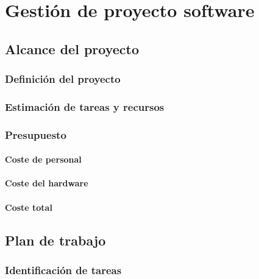 \documentclass[12pt,a4paper,onecolumn,oneside]{report}
\begin{document}
\chapter{Gestión de proyecto software}
\label{Gestión de proyecto software}



\section{Alcance del proyecto}
\label{Alcance del proyecto}

\subsection{Definición del proyecto}



\subsection{Estimación de tareas y recursos}



\subsection{Presupuesto}


\subsubsection{Coste de personal}


\subsubsection{Coste del hardware}



\subsubsection{Coste total}

\section{Plan de trabajo}
\label{Plan de trabajo}


\subsection{Identificación de tareas}
\label{Identificación de tareas}
\end{document}
